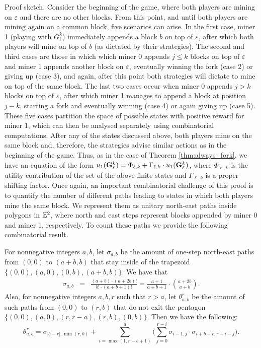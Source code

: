 {\sc Proof sketch.} Consider the beginning of the game, where both players are
mining on $\varepsilon$ and there are no other blocks. From this point, and
until both players are mining again on a common block, five scenarios can
arise. In the first case, miner 1 (playing with $G_\ell^k$) immediately appends
a block $b$ on top of $\varepsilon$, after which both players will mine on top
of $b$ (as dictated by their strategies).  The second and third cases are those
in which which miner 0 appends $j\leq k$ blocks on top of $\varepsilon$ and
miner 1 appends another block on $\varepsilon$, eventually winning the fork
(case 2) or giving up (case 3), and again, after this point both strategies
will dictate to mine on top of the same block. The last two cases occur when
miner 0 appends $j>k$ blocks on top of $\varepsilon$, after which miner 1
manages to append a block at position $j-k$, starting a fork and eventually
winning (case 4) or again giving up (case 5).  These five cases partition the space
of possible states with positive reward for miner 1, which 
can then be analysed separately using combinatorial computations. After any of the
states discussed above, both players mine on the same block and, therefore, the
strategies advise similar actions as in the beginning of the game. 
Thus, as in the case of
Theorem
\ref{thm:always_fork}, we have an equation of the form $u_1({\rm {\bf G}}^k_\ell)  =
\Phi_{\ell, k}+\Gamma_{\ell, k}\cdot u_1({\rm {\bf G}}^k_\ell)$, where $\Phi_{\ell, k}$
is the utility contribution of the set of the above finite states and
$\Gamma_{\ell, k}$ is a proper shifting factor.  
Once again, an important combinatorial challenge of this proof is to quantify the number of different 
paths leading to states in which both players mine the same block. 
We represent them as 
unitary north-east paths
inside polygons in $\mathbb{Z}^2$, where north and east steps represent blocks
appended by miner 0 and miner 1, respectively.  
To count these paths we provide the following combinatorial result. 
\begin{lemma} For nonnegative
    integers $a,b$, let $\sigma_{a,b}$ be the amount of one-step north-east
    paths from $(0,0)$ to $(a+b,b)$ that stay inside of the trapezoid
    $\{(0,0),(a,0),(0,b),(a+b,b)\}.$ We have that
\begin{eqnarray*}
\sigma_{a,b} & = & \frac{(a+b)\cdot(a+2b)!}{b!\cdot(a+b+1)!}=\frac{a+1}{a+b+1}\cdot {a+2b\choose a+b}.
\end{eqnarray*}
    Also, for nonnegative integers $a,b,r$ such that $r>a$, let $\theta_{a,b}^r$ be the
 amount of such paths from $(0,0)$ to $(r,b)$ that do not exit the pentagon
 $\{(0,0),(a,0),(r,r-a),(r,b),(0,b)\}$. Then we have the following:
 $$
\theta_{a,b}^r = \displaystyle \sigma_{|b-r|,\min(r,b)} + \sum_{i=\max(1,r-b+1)}^a  \bigg(\sum_{j=0}^{r-i}\sigma_{i-1,j}\cdot \sigma_{i+b-r,r-i-j} \bigg).
 $$
 \end{lemma}
